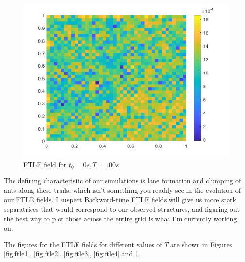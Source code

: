 \begin{figure}
    \centering
    \includegraphics[scale = 0.35]{figures/FTLE_5.jpg}
    \caption{FTLE field for $t_0 = 0s, T = 100s$}
    \label{fig:ftle5}
\end{figure}

The defining characteristic of our simulations is lane formation and clumping of ants along these trails, which isn't something you readily see in the evolution of our FTLE fields. I suspect Backward-time FTLE fields will give us more stark separatrices that would correspond to our observed structures, and figuring out the best way to plot those across the entire grid is what I'm currently working on.

The figures for the FTLE fields for different values of $T$ are shown in Figures \ref{fig:ftle1}, \ref{fig:ftle2}, \ref{fig:ftle3}, \ref{fig:ftle4} and \ref{fig:ftle5}.